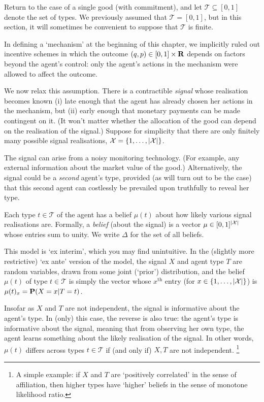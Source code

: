 Return to the case of a single good (with commitment),
and let $\mathcal{T} \subseteq [0,1]$ denote the set of types.
We previously assumed that $\mathcal{T} = [0,1]$,
but in this section, it will sometimes be convenient to suppose that $\mathcal{T}$ is finite.

In defining a `mechanism' at the beginning of this chapter, we implicitly ruled out incentive schemes in which the outcome $(q,p) \in [0,1] \times \mathbf{R}$ depends on factors beyond the agent's control: only the agent's actions in the mechanism were allowed to affect the outcome.

We now relax this assumption. There is a contractible \emph{signal}
whose realisation becomes known
(i) late enough that the agent has already chosen her actions in the mechanism, but
(ii) early enough that monetary payments can be made contingent on it.
(It won't matter whether the allocation of the good can depend on the realisation of the signal.)
Suppose for simplicity that there are only finitely many possible signal realisations, $\mathcal{X}=\{1,\dots,\abs*{\mathcal{X}}\}$.

The signal can arise from a noisy monitoring technology.
(For example, any external information about the market value of the good.)
Alternatively, the signal could be a \emph{second} agent's type,
provided (as will turn out to be the case) that this second agent can costlessly be prevailed upon truthfully to reveal her type.

Each type $t \in \mathcal{T}$ of the agent has a belief $\mu(t)$ about how likely various signal realisations are.
Formally, a \emph{belief} (about the signal) is a vector $\mu \in [0,1]^{\abs*{\mathcal{X}}}$ whose entries sum to unity. We write $\Delta$ for the set of all beliefs.

\begin{remark}
	\label{remark:signal_exante}
	This model is `ex interim', which you may find unintuitive.
	In the (slightly more restrictive) `ex ante' version of the model,
	the signal $X$ and agent type $T$ are random variables, drawn from some joint (`prior') distribution,
	and the belief $\mu(t)$ of type $t \in \mathcal{T}$
	is simply the vector whose $x^\text{th}$ entry (for $x \in \{1,\dots,\abs*{\mathcal{X}}\}$) is $\mu(t)_x = \mathbf{P}( X=x | T=t )$.

	Insofar as $X$ and $T$ are not independent, the signal is informative about the agent's type.
	In (only) this case, the reverse is also true:
	the agent's type is informative about the signal, meaning that from observing her own type, the agent learns something about the likely realisation of the signal.
	In other words, $\mu(t)$ differs across types $t \in \mathcal{T}$
	if (and only if) $X,T$ are not independent.%
		\footnote{A simple example: if $X$ and $T$ are `positively correlated' in the sense of affiliation, then higher types have `higher' beliefs in the sense of monotone likelihood ratio.}
\end{remark}

